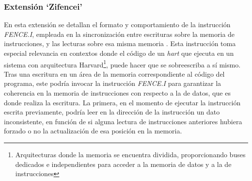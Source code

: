 \subsubsection{Extensión `Zifencei'}

En esta extensión se detallan el formato y comportamiento de la instrucción \textit{FENCE.I}, empleada en la sincronización entre escrituras sobre la memoria de instrucciones, y las lecturas sobre esa misma memoria \cite{riscv-unpriv-isa-20250508-zifencei}.
Esta instrucción toma especial relevancia en contextos donde el código de un \textit{hart} que ejecuta en un sistema con arquitectura Harvard\footnote{Arquitecturas donde la memoria se encuentra dividida, proporcionando buses dedicados e independientes para acceder a la memoria de datos y a la de instrucciones}, puede hacer que se sobreescriba a sí mismo. Tras una escritura en un área de la memoria correspondiente al código del programa, este podría invocar la instrucción \textit{FENCE.I} para garantizar la coherencia en la memoria de instrucciones con respecto a la de datos, que es donde realiza la escritura. La primera, en el momento de ejecutar la instrucción escrita previamente, podría leer en la dirección de la instrucción un dato inconsistente, en función de si alguna lectura de instrucciones anteriores hubiera forzado o no la actualización de esa posición en la memoria.
